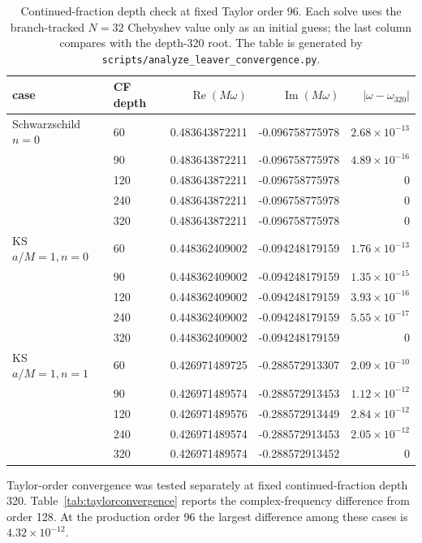 \documentclass[12pt,a4paper]{article}
\begin{document}
\begin{table}[H]
\centering
\scriptsize
\renewcommand{\arraystretch}{1.08}
\begin{tabular}{llrrr}
\toprule
case & CF depth & \(\operatorname{Re}(M\omega)\) &
\(\operatorname{Im}(M\omega)\) & \(|\omega-\omega_{320}|\)\\
\midrule
Schwarzschild \(n=0\) & 60  & 0.483643872211 & -0.096758775978 & \(2.68\times10^{-13}\)\\
 & 90  & 0.483643872211 & -0.096758775978 & \(4.89\times10^{-16}\)\\
 & 120 & 0.483643872211 & -0.096758775978 & \(0\)\\
 & 240 & 0.483643872211 & -0.096758775978 & \(0\)\\
 & 320 & 0.483643872211 & -0.096758775978 & \(0\)\\
\addlinespace
KS \(a/M=1,n=0\) & 60  & 0.448362409002 & -0.094248179159 & \(1.76\times10^{-13}\)\\
 & 90  & 0.448362409002 & -0.094248179159 & \(1.35\times10^{-15}\)\\
 & 120 & 0.448362409002 & -0.094248179159 & \(3.93\times10^{-16}\)\\
 & 240 & 0.448362409002 & -0.094248179159 & \(5.55\times10^{-17}\)\\
 & 320 & 0.448362409002 & -0.094248179159 & \(0\)\\
\addlinespace
KS \(a/M=1,n=1\) & 60  & 0.426971489725 & -0.288572913307 & \(2.09\times10^{-10}\)\\
 & 90  & 0.426971489574 & -0.288572913453 & \(1.12\times10^{-12}\)\\
 & 120 & 0.426971489576 & -0.288572913449 & \(2.84\times10^{-12}\)\\
 & 240 & 0.426971489574 & -0.288572913453 & \(2.05\times10^{-12}\)\\
 & 320 & 0.426971489574 & -0.288572913452 & \(0\)\\
\bottomrule
\end{tabular}
\caption{Continued-fraction depth check at fixed Taylor order 96.  Each solve
uses the branch-tracked \(N=32\) Chebyshev value only as an initial guess; the
last column compares with the depth-320 root.  The table is generated by
\texttt{scripts/analyze\_leaver\_convergence.py}.}
\label{tab:cfconvergence}
\end{table}

Taylor-order convergence was tested separately at fixed continued-fraction
depth 320.  Table~\ref{tab:taylorconvergence} reports the complex-frequency
difference from order 128.  At the production order 96 the largest difference
among these cases is \(4.32\times10^{-12}\).
\end{document}
